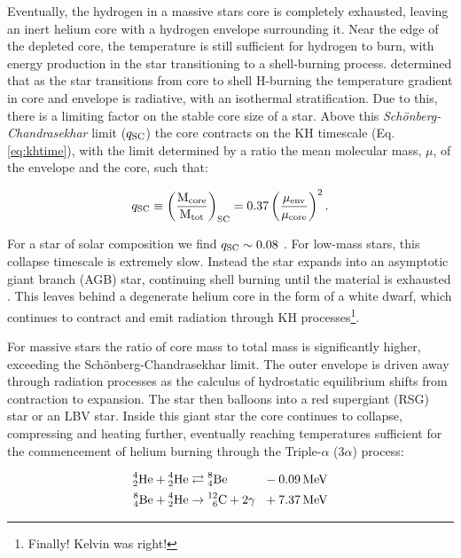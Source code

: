 Eventually, the hydrogen in a massive stars core is completely exhausted, leaving an inert helium core with a hydrogen envelope surrounding it.
Near the edge of the depleted core, the temperature is still sufficient for hydrogen to burn, with energy production in the star transitioning to a shell-burning process.
\textcite{schonbergEvolutionMainSequenceStars1942} determined that as the star transitions from core to shell H-burning the temperature gradient in core and envelope is radiative, with an isothermal stratification.
Due to this, there is a limiting factor on the stable core size of a star.
Above this \emph{Sch{\"o}nberg-Chandrasekhar} limit ($q\rms{SC}$) the core contracts on the KH timescale (Eq. \ref{eq:khtime}), with the limit determined by a ratio the mean molecular mass, $\mu$, of the envelope and the core, such that:

\begin{equation}
  q\rms{SC} \equiv \left(\frac{\mass\rms{core}}{\mass\rms{tot}}\right)\rms{SC} = 0.37 \left(\frac{\mu\rms{env}}{\mu\rms{core}}\right)^2 .
\end{equation}

\noindent
For a star of solar composition we find $q\rms{SC} \sim 0.08$
\parencite[Ch.~5]{salarisEvolutionStarsStellar2005}.
For low-mass stars, this collapse timescale is extremely slow.
Instead the star expands into an asymptotic giant branch (AGB) star, continuing shell burning until the material is exhausted
\parencite{beechSchoenbergChandrasekharLimitPolytropic1988}.
This leaves behind a degenerate helium core in the form of a white dwarf, which continues to contract and emit radiation through KH processes\footnote{Finally! Kelvin was right!}.

For massive stars the ratio of core mass to total mass is significantly higher, exceeding the Sch{\"o}nberg-Chandrasekhar limit.
The outer envelope is driven away through radiation processes as the calculus of hydrostatic equilibrium shifts from contraction to expansion.
The star then balloons into a red supergiant (RSG) star or an LBV star.
Inside this giant star the core continues to collapse, compressing and heating further, eventually reaching temperatures sufficient for the commencement of helium burning through the Triple-$\alpha$ (3$\alpha$) process:

\begin{equation}
  \begin{alignedat}{3}
    \atom{He}{4}{2} + \atom{He}{4}{2} & \rightleftarrows \atom{Be}{8}{4} && ~~ - \SI{0.09}{\mega\electronvolt} \\
    \atom{Be}{8}{4} + \atom{He}{4}{2} & \rightarrow \atom{C}{12}{6} + 2\gamma && ~~ + \SI{7.37}{\mega\electronvolt} 
  \end{alignedat}
\end{equation}


